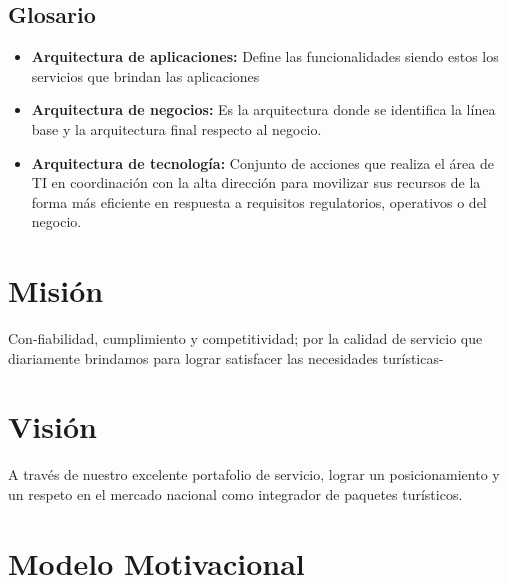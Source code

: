 \documentclass[12pt]{article}
\begin{document}
\subsection{Glosario}
\begin{itemize}
\item \textbf{Arquitectura de aplicaciones:} Define las funcionalidades siendo estos los servicios que brindan las aplicaciones

\item \textbf{Arquitectura de negocios:}  Es la arquitectura donde se identifica la línea base y la arquitectura final respecto al negocio.

\item \textbf{Arquitectura de tecnología:} Conjunto de acciones que realiza el área de TI en coordinación con la alta dirección para movilizar sus recursos de la forma más eficiente en respuesta a requisitos regulatorios, operativos o del negocio. 

\end{itemize}





\section{Misión}
Con-fiabilidad, cumplimiento y competitividad; por la calidad de servicio que diariamente brindamos para lograr satisfacer las necesidades turísticas-




\section{Visión}
A través de nuestro excelente portafolio de servicio, lograr un posicionamiento y un respeto en el mercado nacional como integrador de paquetes turísticos.







\section{Modelo Motivacional}
\end{document}
